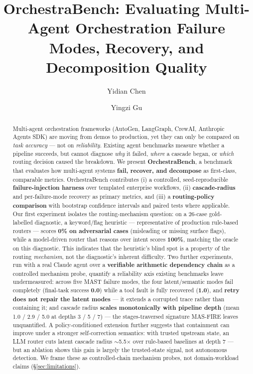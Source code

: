 \documentclass[sigconf,nonacm,anonymous]{acmart}  %
\begin{document}
\title{OrchestraBench: Evaluating Multi-Agent Orchestration Failure
Modes, Recovery, and Decomposition Quality}

\author{Yidian Chen}
\author{Yingzi Gu}

\begin{abstract}
Multi-agent orchestration frameworks (AutoGen, LangGraph, CrewAI, Anthropic
Agents SDK) are moving from demos to production, yet they can only be compared
on \emph{task accuracy} --- not on \emph{reliability}. Existing agent benchmarks
measure whether a pipeline succeeds, but cannot diagnose \emph{why} it failed,
\emph{where} a cascade began, or \emph{which} routing decision caused the
breakdown. We present \textbf{OrchestraBench}, a benchmark that evaluates
how multi-agent systems \textbf{fail, recover, and decompose} as first-class,
comparable metrics. OrchestraBench contributes (i) a controlled,
seed-reproducible \textbf{failure-injection harness} over templated enterprise
workflows, (ii) \textbf{cascade-radius} and per-failure-mode recovery as primary
metrics, and (iii) a \textbf{routing-policy comparison} with bootstrap
confidence intervals and paired tests where applicable. Our first experiment
isolates the routing-mechanism question: on a
26-case gold-labelled diagnostic, a keyword/flag heuristic --- representative of
production rule-based routers --- scores \textbf{0\% on adversarial cases}
(misleading or missing surface flags), while a model-driven router that reasons
over intent scores \textbf{100\%}, matching the oracle on this diagnostic.
This indicates that the heuristic's blind spot is a property of the routing
\emph{mechanism}, not the diagnostic's inherent difficulty. Two further
experiments, run
with a real Claude agent over a \textbf{verifiable arithmetic dependency chain}
as a controlled mechanism probe, quantify a reliability axis existing benchmarks
leave undermeasured: across five MAST failure modes, the four latent/semantic
modes fail completely (final-task success \textbf{0.0}) while a tool fault is
fully recovered (\textbf{1.0}), and \textbf{retry does not repair the latent
modes} --- it extends a corrupted trace rather than containing it; and cascade
radius \textbf{scales monotonically with pipeline depth} (mean 1.0 / 2.9 / 5.0
at depths 3 / 5 / 7) --- the stages-traversed signature MAS-FIRE leaves
unquantified. A policy-conditioned extension further suggests that containment
can improve under a stronger self-correction semantics: with trusted upstream
state, an LLM router cuts latent cascade radius $\sim$5.5$\times$ over rule-based
baselines at depth 7 --- but an ablation shows this gain is largely the
trusted-state signal, not autonomous detection. We frame these as controlled-chain mechanism probes, not
domain-workload claims (\S\ref{sec:limitations}).
\end{abstract}
\end{document}

